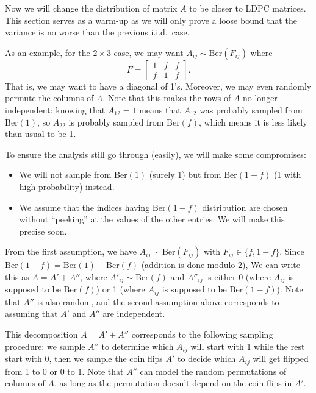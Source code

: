 \documentclass[11pt]{article}
\begin{document}
Now we will change the distribution of matrix $A$ to be closer to LDPC matrices.
This section serves as a warm-up as we will only prove a loose bound that the
variance is no worse than the previous i.i.d.\ case.

As an example, for the $2 \times 3$ case, we may want $A_{ij} \sim \mathrm{Ber}(F_{ij})$
where
\begin{equation*}
  F = \begin{bmatrix} 1 & f & f \\ f & 1 & f \end{bmatrix}.
\end{equation*}
That is, we may want to have a diagonal of 1's.
Moreover, we may even randomly permute the columns of $A$.
Note that this makes the rows of $A$ no longer independent: knowing that $A_{12}
= 1$ means that $A_{12}$ was probably sampled from $\mathrm{Ber}(1)$, so
$A_{22}$ is probably sampled from $\mathrm{Ber}(f)$, which means it is less
likely than usual to be 1.

To ensure the analysis still go through (easily), we will make some compromises:
\begin{itemize}
  \item We will not sample from $\mathrm{Ber}(1)$ (surely 1) but from
  $\mathrm{Ber}(1 - f)$ (1 with high probability) instead.
  \item We assume that the indices having $\mathrm{Ber}(1-f)$ distribution are
  chosen without ``peeking'' at the values of the other entries.
  We will make this precise soon.
\end{itemize}

From the first assumption, we have $A_{ij} \sim \mathrm{Ber}(F_{ij})$ with $F_{ij}
\in \{ f, 1 - f \}$.
Since $\mathrm{Ber}(1 - f) = \mathrm{Ber}(1) + \mathrm{Ber}(f)$ (addition is
done modulo 2),
We can write this as $A = A' + A''$, where $A'_{ij} \sim \mathrm{Ber}(f)$ and
$A''_{ij}$ is either 0 (where $A_{ij}$ is supposed to be $\mathrm{Ber}(f)$) or 1
(where $A_{ij}$ is supposed to be $\mathrm{Ber}(1 - f)$).
Note that $A''$ is also random, and the second assumption above corresponds to
assuming that $A'$ and $A''$ are independent.

This decomposition $A = A' + A''$ corresponds to the following sampling
procedure: we sample $A''$ to determine which $A_{ij}$ will start with 1 while
the rest start with 0, then we sample the coin flips $A'$ to decide which
$A_{ij}$ will get flipped from 1 to 0 or 0 to 1.
Note that $A''$ can model the random permutations of columns of $A$, as long as
the permutation doesn't depend on the coin flips in $A'$.
\end{document}
